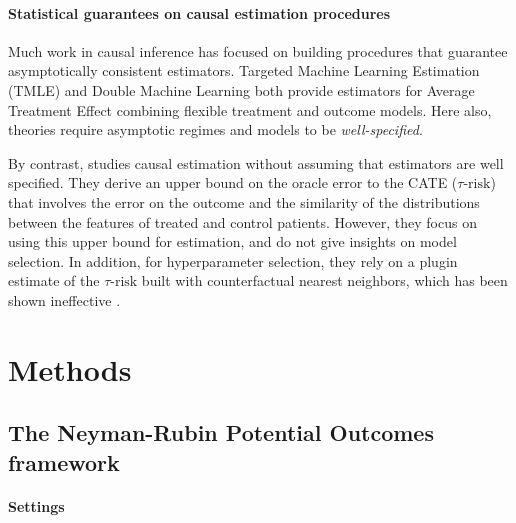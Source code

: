 \documentclass[10pt]{article}
\begin{document}
\begin{multicols}{2}
    \paragraph{Statistical guarantees on causal estimation procedures}

    Much work in causal inference has focused on building procedures that
    guarantee asymptotically consistent estimators. Targeted Machine Learning
    Estimation (TMLE) \cite{laan_targeted_2011,schuler_targeted_2017} and
    Double Machine Learning \cite{chernozhukov_double_2018} both provide
    estimators for Average Treatment Effect combining flexible treatment and
    outcome models. Here also, theories require asymptotic regimes and
    models to be \textit{well-specified}.

    By contrast, \citet{johansson_generalization_2021} studies causal
    estimation without assuming that estimators are well specified. They derive an
    upper bound on the oracle error to the CATE ($\tau\text{-risk}$) that involves
    the error on the outcome and the similarity of the distributions between the
    features of treated and control patients. However, they focus on using this
    upper bound for estimation, and do not give insights on model selection. In
    addition, for hyperparameter selection, they rely on a plugin estimate of the $\tau\text{-risk}$ built with
    counterfactual nearest neighbors, which has been shown ineffective
    \cite{schuler_comparison_2018}.

    \section{Methods}\label{sec:framework}
    \subsection{The Neyman-Rubin Potential Outcomes framework}%
    \label{sec:neyman_rubin}%

    \paragraph{Settings}


\end{multicols}
\end{document}
